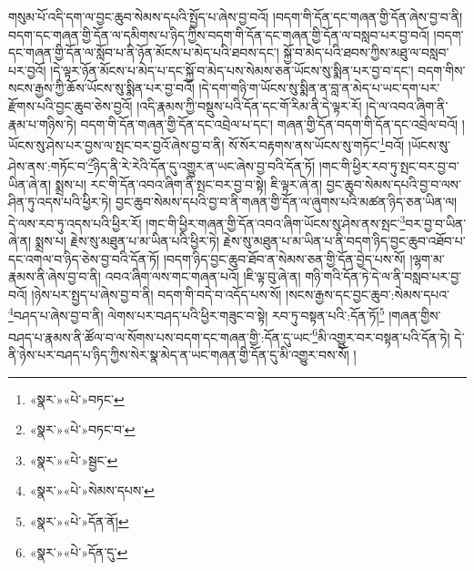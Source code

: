གསུམ་པོ་འདི་དག་ལ་བྱང་ཆུབ་སེམས་དཔའི་སྤྱོད་པ་ཞེས་བྱ་བའོ། །བདག་གི་དོན་དང་གཞན་གྱི་དོན་ཞེས་བྱ་བ་ནི། བདག་དང་གཞན་གྱི་དོན་ལ་དམིགས་པ་ཉིད་ཀྱིས་བདག་གི་དོན་དང་གཞན་གྱི་དོན་ལ་བསླབ་པར་བྱ་བའོ། །བདག་དང་གཞན་གྱི་དོན་ལ་སློབ་པ་ནི་ཉོན་མོངས་པ་མེད་པའི་ཐབས་དང་། སྐྱོ་བ་མེད་པའི་ཐབས་ཀྱིས་མཐུ་ལ་བསླབ་པར་བྱའོ། །དེ་ལྟར་ཉོན་མོངས་པ་མེད་པ་དང་སྐྱོ་བ་མེད་པས་སེམས་ཅན་ཡོངས་སུ་སྨིན་པར་བྱ་བ་དང་། བདག་གིས་སངས་རྒྱས་ཀྱི་ཆོས་ཡོངས་སུ་སྨིན་པར་བྱ་བའོ། །དེ་དག་གཉི་ག་ཡོངས་སུ་སྨིན་ན་བླ་ན་མེད་པ་ཡང་དག་པར་རྫོགས་པའི་བྱང་ཆུབ་ཅེས་བྱའོ། །འདི་རྣམས་ཀྱི་བསྡུས་པའི་དོན་དང་གོ་རིམ་ནི་དེ་ལྟར་རོ། །དེ་ལ་འབའ་ཞིག་ནི་རྣམ་པ་གཉིས་ཏེ། བདག་གི་དོན་གཞན་གྱི་དོན་དང་འབྲེལ་པ་དང་། གཞན་གྱི་དོན་བདག་གི་དོན་དང་འབྲེལ་བའོ། །ཡོངས་སུ་ཤེས་པར་བྱས་ལ་སྤང་བར་བྱའོ་ཞེས་བྱ་བ་ནི། སོ་སོར་བརྟགས་ནས་ཡོངས་སུ་གཏོང་\footnote{«སྣར་»«པེ་»བཏང་}བའོ། །ཡོངས་སུ་ཤེས་ནས་:གཏོང་བ་\footnote{«སྣར་»«པེ་»བཏང་བ་}ཉིད་ནི་རེ་རེའི་དོན་དུ་འགྱུར་ན་ཡང་ཞེས་བྱ་བའི་དོན་ཏོ། །གང་གི་ཕྱིར་རབ་ཏུ་སྤང་བར་བྱ་བ་ཡིན་ཞེ་ན། སྨྲས་པ། རང་གི་དོན་འབའ་ཞིག་ནི་སྤང་བར་བྱ་བ་སྟེ། ཇི་ལྟར་ཞེ་ན། བྱང་ཆུབ་སེམས་དཔའི་བྱ་བ་ལས་ཤིན་ཏུ་འདས་པའི་ཕྱིར་ཏེ། བྱང་ཆུབ་སེམས་དཔའི་བྱ་བ་ནི་གཞན་གྱི་དོན་ལ་ཞུགས་པའི་མཚན་ཉིད་ཅན་ཡིན་ལ། དེ་ལས་རབ་ཏུ་འདས་པའི་ཕྱིར་རོ། །གང་གི་ཕྱིར་གཞན་གྱི་དོན་འབའ་ཞིག་ཡོངས་སུ་ཤེས་ནས་སྤང་\footnote{«སྣར་»«པེ་»སྦྱང་}བར་བྱ་བ་ཡིན་ཞེ་ན། སྨྲས་པ། རྗེས་སུ་མཐུན་པ་མ་ཡིན་པའི་ཕྱིར་ཏེ། རྗེས་སུ་མཐུན་པ་མ་ཡིན་པ་ནི་བདག་ཉིད་བྱང་ཆུབ་འཐོབ་པ་དང་འགལ་བ་ཉིད་ཅེས་བྱ་བའི་དོན་ཏོ། །བདག་ཉིད་བྱང་ཆུབ་ཐོབ་ན་སེམས་ཅན་གྱི་དོན་བྱེད་པས་སོ། །ལྷག་མ་རྣམས་ནི་ཞེས་བྱ་བ་ནི། འབའ་ཞིག་ལས་གང་གཞན་པའོ། །ཇི་ལྟ་བུ་ཞེ་ན། གཉི་གའི་དོན་ཏེ་དེ་ལ་ནི་བསླབ་པར་བྱ་བའོ། །ཉེས་པར་སྤྱད་པ་ཞེས་བྱ་བ་ནི། བདག་གི་བདེ་བ་འདོད་པས་སོ། །སངས་རྒྱས་དང་བྱང་ཆུབ་:སེམས་དཔའ་\footnote{«སྣར་»«པེ་»སེམས་དཔས་}བཤད་པ་ཞེས་བྱ་བ་ནི། ལེགས་པར་བཤད་པའི་ཕྱིར་གཟུང་བ་སྟེ། རབ་ཏུ་བསྟན་པའི་:དོན་ཏོ།\footnote{«སྣར་»«པེ་»དོན་ནོ།} །གཞན་གྱིས་བཤད་པ་རྣམས་ནི་ཚོལ་བ་ལ་སོགས་པས་བདག་དང་གཞན་གྱི་:དོན་དུ་ཡང་\footnote{«སྣར་»«པེ་»དོན་དུ་}མི་འགྱུར་བར་བསྟན་པའི་དོན་ཏེ། དེ་ནི་ཉེས་པར་བཤད་པ་ཉིད་ཀྱིས་སེར་སྣ་མེད་ན་ཡང་གཞན་གྱི་དོན་དུ་མི་འགྱུར་བས་སོ། །
